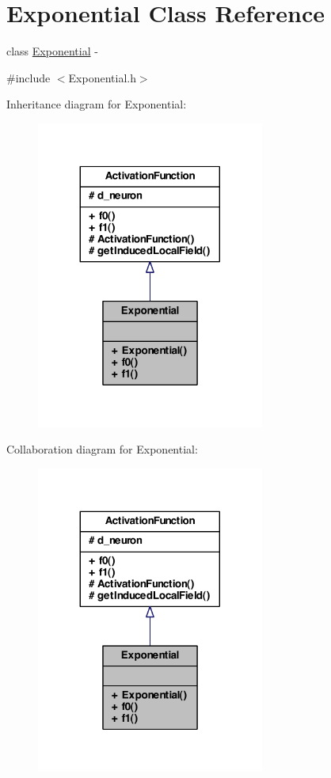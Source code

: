 \hypertarget{class_exponential}{
\section{Exponential Class Reference}
\label{class_exponential}
}


class \hyperlink{class_exponential}{Exponential} -\/  




{\ttfamily \#include $<$Exponential.h$>$}



Inheritance diagram for Exponential:\nopagebreak
\begin{figure}[H]
\begin{center}
\leavevmode
\includegraphics[width=212pt]{class_exponential__inherit__graph}
\end{center}
\end{figure}


Collaboration diagram for Exponential:\nopagebreak
\begin{figure}[H]
\begin{center}
\leavevmode
\includegraphics[width=212pt]{class_exponential__coll__graph}
\end{center}
\end{figure}
